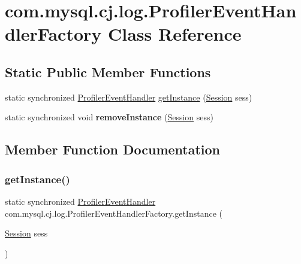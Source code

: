 \hypertarget{classcom_1_1mysql_1_1cj_1_1log_1_1_profiler_event_handler_factory}{}\section{com.\+mysql.\+cj.\+log.\+Profiler\+Event\+Handler\+Factory Class Reference}
\label{classcom_1_1mysql_1_1cj_1_1log_1_1_profiler_event_handler_factory}
\subsection*{Static Public Member Functions}
\begin{DoxyCompactItemize}
\item 
static synchronized \mbox{\hyperlink{interfacecom_1_1mysql_1_1cj_1_1log_1_1_profiler_event_handler}{Profiler\+Event\+Handler}} \mbox{\hyperlink{classcom_1_1mysql_1_1cj_1_1log_1_1_profiler_event_handler_factory_a9c843787773e7e7f942ee7b658105121}{get\+Instance}} (\mbox{\hyperlink{interfacecom_1_1mysql_1_1cj_1_1_session}{Session}} sess)
\item 
\mbox{\label{classcom_1_1mysql_1_1cj_1_1log_1_1_profiler_event_handler_factory_a85c30a6754e18d4debf2888a28c20ee2}} 
static synchronized void {\bfseries remove\+Instance} (\mbox{\hyperlink{interfacecom_1_1mysql_1_1cj_1_1_session}{Session}} sess)
\end{DoxyCompactItemize}


\subsection{Member Function Documentation}
\mbox{\label{classcom_1_1mysql_1_1cj_1_1log_1_1_profiler_event_handler_factory_a9c843787773e7e7f942ee7b658105121}} 
\subsubsection{\texorpdfstring{get\+Instance()}{getInstance()}}
{\footnotesize\ttfamily static synchronized \mbox{\hyperlink{interfacecom_1_1mysql_1_1cj_1_1log_1_1_profiler_event_handler}{Profiler\+Event\+Handler}} com.\+mysql.\+cj.\+log.\+Profiler\+Event\+Handler\+Factory.\+get\+Instance (\begin{DoxyParamCaption}\item[{\mbox{\hyperlink{interfacecom_1_1mysql_1_1cj_1_1_session}{Session}}}]{sess }\end{DoxyParamCaption})\hspace{0.3cm}{\ttfamily [static]}}

